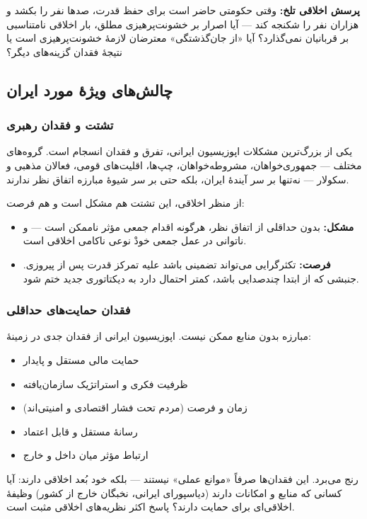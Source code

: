 \begin{tcolorbox}[quotebox]
\textbf{پرسش اخلاقی تلخ:} وقتی حکومتی حاضر است برای حفظ قدرت، صدها نفر 
را بکشد و هزاران نفر را شکنجه کند — آیا اصرار بر خشونت‌پرهیزی مطلق، 
بار اخلاقی نامتناسبی بر قربانیان نمی‌گذارد؟ آیا «از جان‌گذشتگی» معترضان 
لازمهٔ خشونت‌پرهیزی است یا نتیجهٔ فقدان گزینه‌های دیگر؟
\end{tcolorbox}

\subsection{چالش‌های ویژهٔ مورد ایران}

\subsubsection{تشتت و فقدان رهبری}
یکی از بزرگ‌ترین مشکلات اپوزیسیون ایرانی، تفرق و فقدان انسجام است. 
گروه‌های مختلف — جمهوری‌خواهان، مشروطه‌خواهان، چپ‌ها، اقلیت‌های قومی، 
فعالان مذهبی و سکولار — نه‌تنها بر سر آیندهٔ ایران، بلکه حتی بر سر 
شیوهٔ مبارزه اتفاق نظر ندارند.

از منظر اخلاقی، این تشتت هم مشکل است و هم فرصت:
\begin{itemize}
\item \textbf{مشکل:} بدون حداقلی از اتفاق نظر، هرگونه اقدام جمعی مؤثر 
ناممکن است — و ناتوانی در عمل جمعی خودْ نوعی ناکامی اخلاقی است.
\item \textbf{فرصت:} تکثرگرایی می‌تواند تضمینی باشد علیه تمرکز قدرت پس 
از پیروزی. جنبشی که از ابتدا چندصدایی باشد، کمتر احتمال دارد به 
دیکتاتوری جدید ختم شود.
\end{itemize}

\subsubsection{فقدان حمایت‌های حداقلی}
مبارزه بدون منابع ممکن نیست. اپوزیسیون ایرانی از فقدان جدی در زمینهٔ:
\begin{itemize}
\item حمایت مالی مستقل و پایدار
\item ظرفیت فکری و استراتژیک سازمان‌یافته
\item زمان و فرصت (مردم تحت فشار اقتصادی و امنیتی‌اند)
\item رسانهٔ مستقل و قابل اعتماد
\item ارتباط مؤثر میان داخل و خارج
\end{itemize}
رنج می‌برد. این فقدان‌ها صرفاً «موانع عملی» نیستند — بلکه خود بُعد 
اخلاقی دارند: آیا کسانی که منابع و امکانات دارند (دیاسپورای ایرانی، 
نخبگان خارج از کشور) وظیفهٔ اخلاقی‌ای برای حمایت دارند؟ پاسخ 
اکثر نظریه‌های اخلاقی مثبت است.

